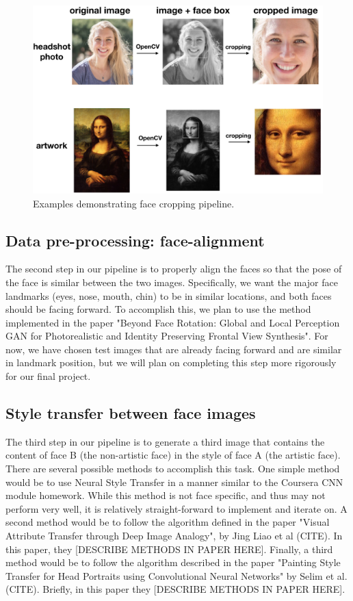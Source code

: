 \documentclass{pnastwo2}
\begin{document}
\begin{article}
\begin{figure}[ht]
	\begin{center}
		\includegraphics[width=.45\textwidth]{face_crop_figure}
		\caption{Examples demonstrating face cropping pipeline.} \label{fig:face_crop}
	\end{center}
\end{figure} 

\subsection{Data pre-processing: face-alignment}

The second step in our pipeline is to properly align the faces so that the pose of the face is similar between the two images. Specifically, we want the major face landmarks (eyes, nose, mouth, chin) to be in similar locations, and both faces should be facing forward. To accomplish this, we plan to use the method implemented in the paper "Beyond Face Rotation: Global and Local Perception GAN for Photorealistic and Identity Preserving Frontal View Synthesis". For now, we have chosen test images that are already facing forward and are similar in landmark position, but we will plan on completing this step more rigorously for our final project. 

\subsection{Style transfer between face images}

The third step in our pipeline is to generate a third image that contains the content of face B (the non-artistic face) in the style of face A (the artistic face). There are several possible methods to accomplish this task. One simple method would be to use Neural Style Transfer in a manner similar to the Coursera CNN module homework. While this method is not face specific, and thus may not perform very well, it is relatively straight-forward to implement and iterate on. A second method would be to follow the algorithm defined in the paper "Visual Attribute Transfer through Deep Image Analogy", by Jing Liao et al (CITE). In this paper, they [DESCRIBE METHODS IN PAPER HERE]. Finally, a third method would be to follow the algorithm described in the paper "Painting Style Transfer for Head Portraits using Convolutional Neural Networks" by Selim et al. (CITE). Briefly, in this paper they [DESCRIBE METHODS IN PAPER HERE].


\end{article}
\end{document}

